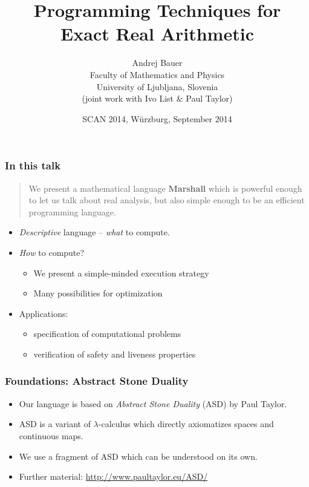 \documentclass{beamer}
\title{Programming Techniques for\\
Exact Real Arithmetic}
\author{Andrej Bauer\\
{\footnotesize Faculty of Mathematics and Physics}\\
{\footnotesize University of Ljubljana, Slovenia}\\[2ex]
(joint work with Ivo List \& Paul Taylor)
}
\date{SCAN 2014, Würzburg, September 2014}
\begin{document}
\begin{frame}
  \titlepage
\end{frame}

\begin{frame}
  \frametitle{In this talk}

  \begin{quote}
    We present a mathematical language \textbf{Marshall} which is powerful enough to
    let us talk about real analysis, but also simple enough to be an efficient programming
    language.
  \end{quote}


  \pause

  \begin{itemize}
  \item \emph{Descriptive} language -- \emph{what} to compute.
  \item \emph{How} to compute?
    \begin{itemize}
    \item We present a simple-minded execution strategy
    \item Many possibilities for optimization
    \end{itemize}
  \item Applications:
    \begin{itemize}
    \item specification of computational problems
    \item verification of safety and liveness properties
    \end{itemize}
  \end{itemize}
\end{frame}

\begin{frame}
  \frametitle{Foundations: Abstract Stone Duality}

  \begin{itemize}
  \item Our language is based on \emph{Abstract Stone
      Duality} (ASD) by Paul Taylor.
  \item ASD is a variant of $\lambda$-calculus which directly
    axiomatizes spaces and continuous maps.
  \item We use a fragment of ASD which can be understood on its own.
  \item Further material: \url{http://www.paultaylor.eu/ASD/}
  \end{itemize}

\end{frame}
\end{document}
